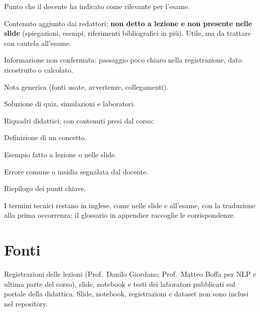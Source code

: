 \begin{esame}
Punto che il docente ha indicato come rilevante per l'esame.
\end{esame}

\begin{integrazione}
Contenuto aggiunto dai redattori: \textbf{non detto a lezione e non presente nelle slide}
(spiegazioni, esempi, riferimenti bibliografici in più). Utile, ma da trattare con cautela all'esame.
\end{integrazione}

\begin{verifica}
Informazione non confermata: passaggio poco chiaro nella registrazione, dato ricostruito o calcolato.
\end{verifica}

\begin{nota}
Nota generica (fonti usate, avvertenze, collegamenti).
\end{nota}

\begin{soluzione}
Soluzione di quiz, simulazioni e laboratori.
\end{soluzione}

Riquadri didattici, con contenuti presi dal corso:

\begin{definizione}[termine]
Definizione di un concetto.
\end{definizione}

\begin{esempio}
Esempio fatto a lezione o nelle slide.
\end{esempio}

\begin{attenzione}
Errore comune o insidia segnalata dal docente.
\end{attenzione}

\begin{sintesi}
Riepilogo dei punti chiave.
\end{sintesi}


I termini tecnici restano in inglese, come nelle slide e all'esame, con la traduzione alla prima
occorrenza; il glossario in appendice raccoglie le corrispondenze.

\section*{Fonti}
Registrazioni delle lezioni (Prof.~Danilo Giordano; Prof.~Matteo Boffa per NLP e ultima parte del
corso), slide, notebook e testi dei laboratori pubblicati sul portale della didattica. Slide, notebook,
registrazioni e dataset non sono inclusi nel repository.
